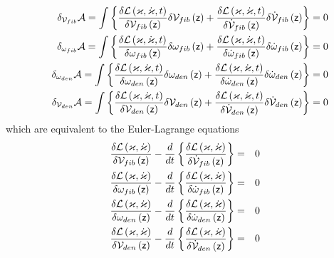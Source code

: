 \begin{eqnarray}
&&\delta _{{\cal V}_{fib}}{\cal A}=\int \left\{ \frac{\delta {\cal L}\left(
\varkappa ,\dot{\varkappa},t\right) }{\delta {\cal V}_{fib}\left( {\sf z}%
\right) }\delta {\cal V}_{fib}\left( {\sf z}\right) +\frac{\delta {\cal L}%
\left( \varkappa ,\dot{\varkappa},t\right) }{\delta {\cal \dot{V}}%
_{fib}\left( {\sf z}\right) }\delta {\cal \dot{V}}_{fib}\left( {\sf z}%
\right) \right\} =0  \nonumber \\
&&\delta _{{\cal \omega }_{fib}}{\cal A}=\int \left\{ \frac{\delta {\cal L}%
\left( \varkappa ,\dot{\varkappa},t\right) }{\delta {\cal \omega }%
_{fib}\left( {\sf z}\right) }\delta {\cal \omega }_{fib}\left( {\sf z}%
\right) +\frac{\delta {\cal L}\left( \varkappa ,\dot{\varkappa},t\right) }{%
\delta {\cal \dot{\omega}}_{fib}\left( {\sf z}\right) }\delta {\cal \dot{%
\omega}}_{fib}\left( {\sf z}\right) \right\} =0  \nonumber \\
&&\delta _{{\cal \omega }_{den}}{\cal A}=\int \left\{ \frac{\delta {\cal L}%
\left( \varkappa ,\dot{\varkappa},t\right) }{\delta {\cal \omega }%
_{den}\left( {\sf z}\right) }\delta {\cal \omega }_{den}\left( {\sf z}%
\right) +\frac{\delta {\cal L}\left( \varkappa ,\dot{\varkappa},t\right) }{%
\delta {\cal \dot{\omega}}_{den}\left( {\sf z}\right) }\delta {\cal \dot{%
\omega}}_{den}\left( {\sf z}\right) \right\} =0  \nonumber \\
&&\delta _{{\cal V}_{den}}{\cal A}=\int \left\{ \frac{\delta {\cal L}\left(
\varkappa ,\dot{\varkappa},t\right) }{\delta {\cal V}_{den}\left( {\sf z}%
\right) }\delta {\cal V}_{den}\left( {\sf z}\right) +\frac{\delta {\cal L}%
\left( \varkappa ,\dot{\varkappa},t\right) }{\delta {\cal \dot{V}}%
_{den}\left( {\sf z}\right) }\delta {\cal \dot{V}}_{den}\left( {\sf z}%
\right) \right\} =0
\end{eqnarray}%
which are equivalent to the Euler-Lagrange equations 
\begin{eqnarray}
\frac{\delta {\cal L}\left( {\cal \varkappa },{\cal \dot{\varkappa}}\right) 
}{\delta {\cal V}_{fib}\left( {\sf z}\right) }-\frac{d}{dt}\left\{ \frac{%
\delta {\cal L}\left( {\cal \varkappa },{\cal \dot{\varkappa}}\right) }{%
\delta {\cal \dot{V}}_{fib}\left( {\sf z}\right) }\right\} &=&0  \nonumber \\
\frac{\delta {\cal L}\left( {\cal \varkappa },{\cal \dot{\varkappa}}\right) 
}{\delta \omega _{fib}\left( {\sf z}\right) }-\frac{d}{dt}\left\{ \frac{%
\delta {\cal L}\left( {\cal \varkappa },{\cal \dot{\varkappa}}\right) }{%
\delta \dot{\omega}_{fib}\left( {\sf z}\right) }\right\} &=&0  \nonumber \\
\frac{\delta {\cal L}\left( {\cal \varkappa },{\cal \dot{\varkappa}}\right) 
}{\delta \omega _{den}\left( {\sf z}\right) }-\frac{d}{dt}\left\{ \frac{%
\delta {\cal L}\left( {\cal \varkappa },{\cal \dot{\varkappa}}\right) }{%
\delta \dot{\omega}_{den}\left( {\sf z}\right) }\right\} &=&0  \nonumber \\
\frac{\delta {\cal L}\left( {\cal \varkappa },{\cal \dot{\varkappa}}\right) 
}{\delta {\cal V}_{den}\left( {\sf z}\right) }-\frac{d}{dt}\left\{ \frac{%
\delta {\cal L}\left( {\cal \varkappa },{\cal \dot{\varkappa}}\right) }{%
\delta {\cal \dot{V}}_{den}\left( {\sf z}\right) }\right\} &=&0
\end{eqnarray}%
